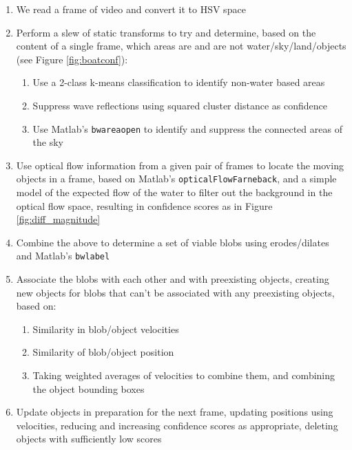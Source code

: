 \documentclass[conference]{IEEEtran}
\begin{document}
\begin{enumerate}
\item We read a frame of video and convert it to HSV space
\item Perform a slew of static transforms to try and determine,
      based on the content of a single frame, which areas are and
      are not water/sky/land/objects (see Figure \ref{fig:boatconf}):
  \begin{enumerate}
    \item Use a 2-class k-means classification to
          identify non-water based areas
    \item Suppress wave reflections using squared cluster distance as confidence
    \item Use Matlab's \texttt{bwareaopen} to
          identify and suppress the connected areas of the sky
  \end{enumerate}
\item Use optical flow information from a given pair of frames to
      locate the moving objects in a frame, based on Matlab's
      \texttt{opticalFlowFarneback}, and a simple model of the
      expected flow of the water to filter out the background in
      the optical flow space, resulting in confidence scores
      as in Figure \ref{fig:diff_magnitude}
\item Combine the above to determine a set of viable blobs using erodes/dilates
      and Matlab's \texttt{bwlabel}
\item Associate the blobs with each other and with preexisting objects,
      creating new objects for blobs that can't be associated with any
      preexisting objects, based on:
  \begin{enumerate}
    \item Similarity in blob/object velocities
    \item Similarity of blob/object position
    \item Taking weighted averages of velocities to combine them, and
          combining the object bounding boxes
  \end{enumerate}
\item Update objects in preparation for the next frame, updating
      positions using velocities, reducing and increasing confidence
      scores as appropriate, deleting objects with sufficiently low
      scores
\end{enumerate}
\end{document}
